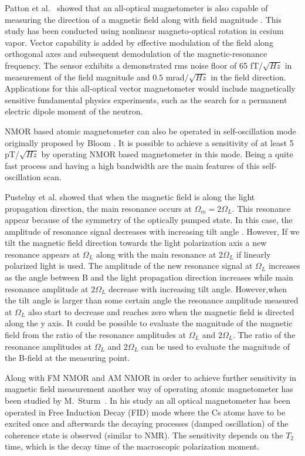 Patton et al.~\cite{bib:vectormagnetometer} showed that an all-optical magnetometer is also capable of measuring the direction of a magnetic field along with field magnitude .  This study has been conducted using nonlinear magneto-optical rotation in cesium vapor.  Vector capability is added by effective modulation of the field along orthogonal axes and subsequent demodulation of the magnetic-resonance frequency.  The sensor exhibits a demonstrated rms noise floor of   65 fT/$\sqrt {Hz}$ in measurement of the field magnitude and $ 0.5$  mrad/$\sqrt {Hz}$ in the field direction.  Applications for this all-optical vector magnetometer would include magnetically sensitive fundamental physics experiments, such as the search for a permanent electric dipole moment of the neutron.

NMOR based atomic magnetometer can also be operated in self-oscillation mode \cite{PhysRevA.62.043403,bib:Budker_2006} originally proposed by Bloom \cite{bib:Bloom_62}. It is possible to achieve a sensitivity of at least 5 pT/$\sqrt {Hz}$ by operating NMOR based magnetometer in this mode.
 Being a quite fast process and having a high bandwidth are
the main features of this self-oscillation scan. 

Pustelny et al. \cite{PhysRevA.74.063420}  showed that when the magnetic field is along the light propagation direction, the main resonance occurs at $\Omega_m = 2\Omega_L$. This resonance appear because of the symmetry of the optically pumped state.  In this case, the amplitude of resonance signal decreases with increasing tilt angle . However, If we tilt the magnetic field direction towards the light polarization axis a new resonance appears at $\Omega_L$ along with the main resonance at $2\Omega_L$ if linearly polarized light is used. The amplitude of the new resonance signal at $\Omega_L$  increases as the angle between B and the light propagation direction increases while main resonance amplitude at $2\Omega_L$  decrease with increasing tilt angle. However,when the tilt angle is larger than some certain angle the resonance amplitude measured at $\Omega_L$ also start to decrease and reaches zero when the magnetic field is directed along the y axis.   It could be possible to evaluate the magnitude of the magnetic field from the ratio of the resonance amplitudes at $\Omega_L$ and $2\Omega_L$. The ratio of the resonance amplitudes at $\Omega_L$ and $2\Omega_L$ can be used to
evaluate the magnitude of the B-field at the measuring point.


Along with FM NMOR and AM NMOR in order to achieve further sensitivity in magnetic field measurement another way of operating  atomic magnetometer
has been studied by M.~Sturm~\cite{mythesis}. In his study an all optical magnetometer has been operated in Free Induction Decay (FID) mode where the Cs atoms have to be excited
once and afterwards the decaying processes (damped oscillation) of the coherence state is
observed (similar to NMR). The sensitivity depends on the $T_2$ time, which is the decay time
of the macroscopic polarization moment.


